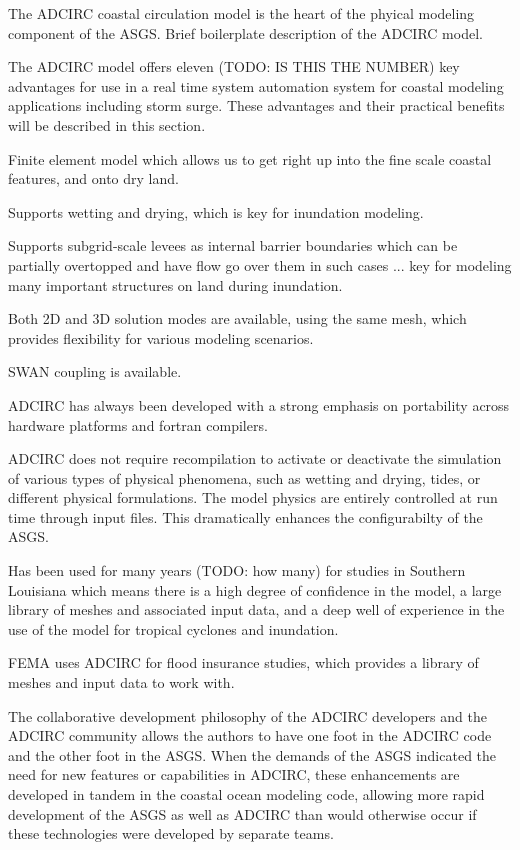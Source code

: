 \documentclass[jmse,article,submit,moreauthors,pdftex,12pt,a4paper]{mdpi}
\begin{document}
The ADCIRC coastal circulation model is the heart of the phyical 
modeling component of the ASGS. Brief boilerplate description of the 
ADCIRC model. 

The ADCIRC model offers eleven (TODO: IS THIS THE NUMBER) key 
advantages for use in a real time system automation system for 
coastal modeling applications including storm surge. These 
advantages and their practical benefits will be described in this 
section. 

Finite element model which allows us to get right up into the fine 
scale coastal features, and onto dry land. 

Supports wetting and drying, which is key for inundation modeling.

Supports subgrid-scale levees as internal barrier boundaries which 
can be partially overtopped and have flow go over them in such cases 
... key for modeling many important structures on land during 
inundation. 

Both 2D and 3D solution modes are available, using the same mesh, 
which provides flexibility for various modeling scenarios. 

SWAN coupling is available. 


ADCIRC has always been developed with a strong emphasis on 
portability across hardware platforms and fortran compilers.

ADCIRC does not require recompilation to activate or deactivate the 
simulation of various types of physical phenomena, such as wetting 
and drying, tides, or different physical formulations. The model 
physics are entirely controlled at run time through input files. 
This dramatically enhances the configurabilty of the ASGS. 

Has been used for many years (TODO: how many) for studies in 
Southern Louisiana which means there is a high degree of confidence 
in the model, a large library of meshes and associated input data, 
and a deep well of experience in the use of the model for tropical 
cyclones and inundation. 

FEMA uses ADCIRC for flood insurance studies, which provides a library
of meshes and input data to work with.

The collaborative development philosophy of the ADCIRC developers
and the ADCIRC community allows the authors to have one foot in the
ADCIRC code and the other foot in the ASGS. When the demands of the
ASGS indicated the need for new features or capabilities in ADCIRC, 
these enhancements are developed in tandem in the coastal ocean modeling
code, allowing more rapid development of the ASGS as well as ADCIRC
than would otherwise occur if these technologies were developed by
separate teams. 
\end{document}
